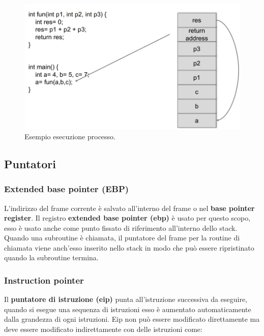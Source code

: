\begin{figure}[H]
    \centering
    \includegraphics[width=13cm, keepaspectratio]{capitoli/secure_coding/img/cap_2/es_esecuzione_processo.png}
    \caption{Esempio esecuzione processo.}\label{fig:es_esec_processo}
\end{figure}

\subsection{Puntatori}

\subsubsection{Extended base pointer (EBP)}

L'indirizzo del frame corrente è salvato all'interno del frame o
nel \textbf{base pointer register}.
Il registro \textbf{extended base pointer (ebp) } è usato per questo scopo, esso è
usato anche come punto fissato di riferimento all'interno dello stack. Quando una
subroutine è chiamata, il puntatore del frame per la routine di chiamata viene anch'esso
inserito nello stack in modo che può essere ripristinato quando la subroutine termina.

\subsubsection{Instruction pointer}

Il \textbf{puntatore di istruzione (eip)} punta all'istruzione successiva da eseguire,
quando si esegue una sequenza di istruzioni esso è aumentato automaticamente dalla
grandezza di ogni istruzioni. Eip non può essere modificato direttamente ma deve
essere modificato indirettamente con delle istruzioni come:

